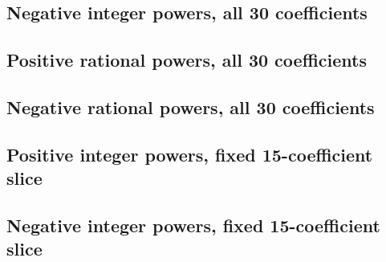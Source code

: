 \documentclass[10pt]{article}
\begin{document}
\subsection{Negative integer powers, all 30 coefficients}

\clearpage
\subsection{Positive rational powers, all 30 coefficients}

\subsection{Negative rational powers, all 30 coefficients}

\clearpage
\subsection{Positive integer powers, fixed 15-coefficient slice}

\subsection{Negative integer powers, fixed 15-coefficient slice}

\clearpage
\end{document}
